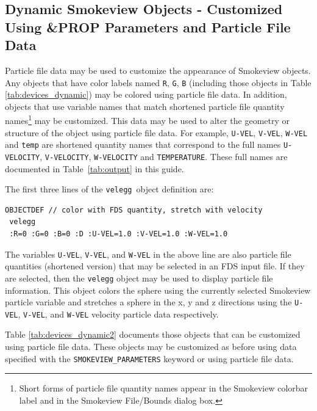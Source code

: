 \subsection{Dynamic Smokeview Objects - Customized Using \&PROP Parameters and Particle File Data}
Particle file data may be used to customize the appearance of Smokeview objects.  Any objects that have color
labels named {\tt R}, {\tt G}, {\tt B} (including those objects in Table \ref{tab:devices_dynamic}) may be
colored using particle file data.  In addition, objects that use variable names that match shortened
particle file quantity names\footnote{Short forms of particle file quantity names appear in the Smokeview colorbar label
and in the Smokeview File/Bounds dialog box.}
may be customized.  This data may be used to alter the geometry or structure of the object
using particle file data.  For example, {\tt U-VEL}, {\tt V-VEL}, {\tt W-VEL} and {\tt temp} are shortened
quantity names that correspond to the full names {\tt U-VELOCITY}, {\tt V-VELOCITY}, {\tt W-VELOCITY} and
{\tt TEMPERATURE}.  These full names are documented in Table~\ref{tab:output} in this guide.

The first three lines of the {\tt velegg}\ object definition are:
\begin{verbatim}
OBJECTDEF // color with FDS quantity, stretch with velocity
 velegg
 :R=0 :G=0 :B=0 :D :U-VEL=1.0 :V-VEL=1.0 :W-VEL=1.0
 \end{verbatim}
The variables {\tt U-VEL}, {\tt V-VEL}, and {\tt W-VEL} in the above line are also particle file quantities (shortened version) that may be
selected in an FDS input file.  If they are selected, then the {\tt velegg} object may be used to display
particle file information. This  object colors the sphere using the currently selected Smokeview particle
variable and stretches a sphere in the x, y and z directions using the {\tt U-VEL}, {\tt V-VEL}, and {\tt W-VEL}
velocity particle data respectively.

Table \ref{tab:devices_dynamic2} documents those objects that can be customized
using particle file data.  These objects may be customized as before using data specified with the {\tt SMOKEVIEW\_PARAMETERS}
keyword or using particle file data.

